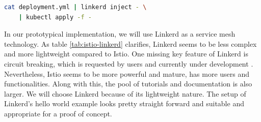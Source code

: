 \begin{lstlisting}[language=bash,caption={Injection of sidecards into a deployment in Linkerd}, label={lst:linkerd}]
cat deployment.yml | linkerd inject - \
	| kubectl apply -f -
\end{lstlisting}

%
% 

In our prototypical implementation, we will use Linkerd as a service mesh technology. As table \ref{tab:istio-linkerd} clarifies, Linkerd seems to be less complex and more lightweight compared to Istio. One missing key feature of Linkerd is circuit breaking, which is requested by users and currently under development \cite{linkerd-circuit-breaker}. Nevertheless, Istio seems to be more powerful and mature, has more users and functionalities. Along with this, the pool of tutorials and documentation is also larger.
We will choose Linkerd because of its lightweight nature. The setup of Linkerd's hello world example looks pretty straight forward and suitable and appropriate for a proof of concept.